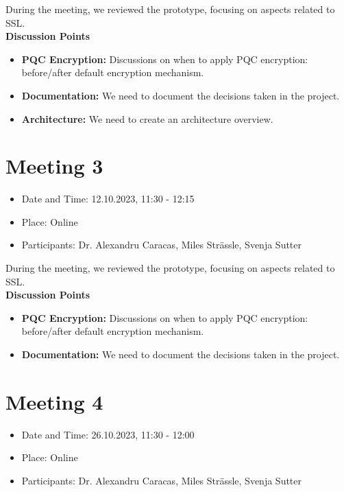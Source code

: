 \noindent During the meeting, we reviewed the prototype, focusing on aspects related to SSL.\\

\noindent\textbf{Discussion Points}
\begin{itemize}
    \item \textbf{PQC Encryption:} Discussions on when to apply PQC encryption: before/after default encryption mechanism.
    \item \textbf{Documentation:} We need to document the decisions taken in the project.
    \item \textbf{Architecture:} We need to create an architecture overview.
\end{itemize}

\section{Meeting 3}

\begin{itemize}
    \item Date and Time: 12.10.2023, 11:30 - 12:15
    \item Place: Online
    \item Participants: Dr. Alexandru Caracas, Miles Strässle, Svenja Sutter
\end{itemize}

\noindent During the meeting, we reviewed the prototype, focusing on aspects related to SSL.\\

\noindent\textbf{Discussion Points}
\begin{itemize}
    \item \textbf{PQC Encryption:} Discussions on when to apply PQC encryption: before/after default encryption mechanism.
    \item \textbf{Documentation:} We need to document the decisions taken in the project.
\end{itemize}

\section{Meeting 4}

\begin{itemize}
    \item Date and Time: 26.10.2023, 11:30 - 12:00
    \item Place: Online
    \item Participants: Dr. Alexandru Caracas, Miles Strässle, Svenja Sutter
\end{itemize}

